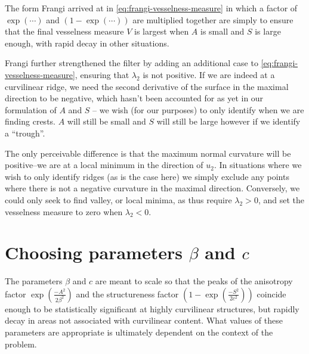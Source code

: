 The form Frangi arrived at in \cref{eq:frangi-vesselness-measure} in which a factor of $\exp(\cdots)$ and $(1 - \exp(\cdots))$ are multiplied together are simply to ensure that the final vesselness measure $V$ is largest when $A$ is small and $S$ is large enough, with rapid decay in other situations.

Frangi further strengthened the filter by adding an additional case to \cref{eq:frangi-vesselness-measure}, ensuring that $\lambda_2$ is not positive. If we are indeed at a curvilinear ridge, we need the second derivative of the surface in the maximal direction to be negative, which hasn't been accounted for as yet in our formulation of $A$ and $S$ -- we wish (for our purposes) to only identify when we are finding crests. $A$ will still be small and $S$ will still be large however if we identify a ``trough''.

The only perceivable difference is that the maximum normal curvature will be positive--we are at a local minimum in the direction of $u_2$. In situations where we wish to only identify ridges (as is the case here) we simply exclude any points where there is not a negative curvature in the maximal direction. Conversely, we could only seek to find valley, or local minima, as thus require $\lambda_2 > 0$, and set the vesselness measure to zero when $\lambda_2 < 0$.



\section{Choosing parameters $\beta$ and $c$}

The parameters $\beta$ and $c$ are meant to scale so that the peaks of the anisotropy factor $\exp(\frac{-A^2}{2\beta^2})$ and the structureness factor $(1-\exp\left(\frac{-S^2}{2c^2}\right))$ coincide enough to be statistically significant at highly curvilinear structures, but rapidly decay in areas not associated with curvilinear content. What values of these parameters are appropriate is ultimately dependent on the context of the problem.

